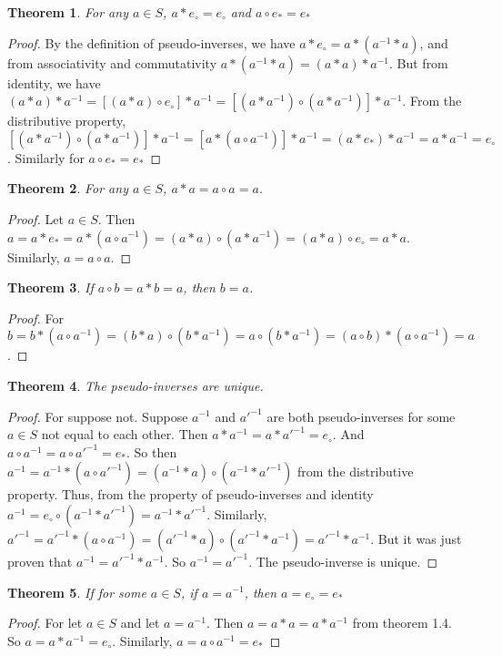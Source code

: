 \documentclass[crop=false,class=book]{standalone}
\theoremstyle{mystyle}
\newtheorem{theorem}{Theorem}[section]
\begin{document}
\begin{theorem} For any $a\in S$, $a*e_{\circ}=e_{\circ}$ and $a\circ e_{*}=e_{*}$
\end{theorem}
\begin{proof} By the definition of pseudo-inverses, we have $a*e_{\circ}=a*(a^{-1}*a)$, and from associativity and commutativity $a*(a^{-1}*a)=(a*a)*a^{-1}$. But from identity, we have $(a*a)*a^{-1}=[(a*a)\circ e_{\circ}]*a^{-1}=[(a*a^{-1})\circ (a*a^{-1})]*a^{-1}$. From the distributive property, $[(a*a^{-1})\circ (a*a^{-1})]*a^{-1}=[a*(a\circ a^{-1})]*a^{-1}=(a*e_{*})*a^{-1}=a*a^{-1}=e_{\circ}$. Similarly for $a\circ e_{*}=e_{*}$
\end{proof}
\begin{theorem} For any $a\in S$, $a*a = a\circ a = a$.
\end{theorem}
\begin{proof} Let $a\in S$. Then $a=a*e_{*}=a*(a\circ a^{-1})=(a*a)\circ(a*a^{-1})=(a*a)\circ e_{\circ}=a*a$. Similarly, $a=a\circ a$.
\end{proof}
\begin{theorem} If $a\circ b = a*b = a$, then $b=a$. 
\end{theorem}
\begin{proof}
For $b = b*(a\circ a^{-1}) = (b*a)\circ(b* a^{-1})= a\circ (b* a^{-1}) = (a\circ b)*(a\circ a^{-1}) = a$.
\end{proof}
\begin{theorem} The pseudo-inverses are unique.
\end{theorem}
\begin{proof} For suppose not. Suppose $a^{-1}$ and $a'^{-1}$ are both pseudo-inverses for some $a\in S$ not equal to each other.  Then $a*a^{-1}=a* a'^{-1}=e_{\circ}$. And $a\circ a^{-1}=a\circ a'^{-1}=e_{*}$. So then $a^{-1}=a^{-1}*(a\circ a'^{-1})=(a^{-1}*a)\circ (a^{-1}*a'^{-1})$ from the distributive property. Thus, from the property of pseudo-inverses and identity $a^{-1}=e_{\circ}\circ (a^{-1}*a'^{-1})=a^{-1}*a'^{-1}$. Similarly, $a'^{-1}=a'^{-1}*(a\circ a^{-1})=(a'^{-1}*a)\circ (a'^{-1}*a^{-1})=a'^{-1}*a^{-1}$. But it was just proven that $a^{-1}=a'^{-1}*a^{-1}$. So $a^{-1}=a'^{-1}$. The pseudo-inverse is unique.
\end{proof}
\begin{theorem} If for some $a\in S$, if $a=a^{-1}$, then $a=e_{\circ}=e_{*}$
\end{theorem}
\begin{proof} For let $a\in S$ and let $a=a^{-1}$. Then $a=a*a=a*a^{-1}$ from theorem 1.4. So $a=a*a^{-1}=e_{\circ}$. Similarly, $a=a\circ a^{-1} = e_{*}$
\end{proof}
\end{document}
